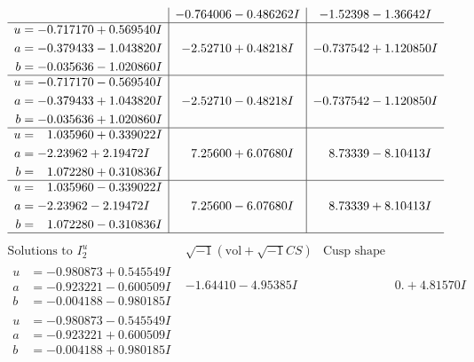 \documentclass[1p]{elsarticle_modified}
\theoremstyle{definition}
\newcommand{\I}{\sqrt{-1}}
\begin{document}
$$\begin{array}{c|c|c}
 & -0.764006 - 0.486262 I & -1.52398 - 1.36642 I \\ \hline\begin{aligned}
u &= -0.717170 + 0.569540 I \\
a &= -0.379433 - 1.043820 I \\
b &= -0.035636 - 1.020860 I\end{aligned}
 & -2.52710 + 0.48218 I & -0.737542 + 1.120850 I \\ \hline\begin{aligned}
u &= -0.717170 - 0.569540 I \\
a &= -0.379433 + 1.043820 I \\
b &= -0.035636 + 1.020860 I\end{aligned}
 & -2.52710 - 0.48218 I & -0.737542 - 1.120850 I \\ \hline\begin{aligned}
u &= \phantom{-}1.035960 + 0.339022 I \\
a &= -2.23962 + 2.19472 I \\
b &= \phantom{-}1.072280 + 0.310836 I\end{aligned}
 & \phantom{-}7.25600 + 6.07680 I & \phantom{-}8.73339 - 8.10413 I \\ \hline\begin{aligned}
u &= \phantom{-}1.035960 - 0.339022 I \\
a &= -2.23962 - 2.19472 I \\
b &= \phantom{-}1.072280 - 0.310836 I\end{aligned}
 & \phantom{-}7.25600 - 6.07680 I & \phantom{-}8.73339 + 8.10413 I\\
 \hline 
 \end{array}$$\newpage$$\begin{array}{c|c|c}  
\text{Solutions to }I^u_{2}& \I (\text{vol} + \sqrt{-1}CS) & \text{Cusp shape}\\
 \hline 
\begin{aligned}
u &= -0.980873 + 0.545549 I \\
a &= -0.923221 - 0.600509 I \\
b &= -0.004188 - 0.980185 I\end{aligned}
 & -1.64410 - 4.95385 I & \phantom{-0.000000 -}0. + 4.81570 I \\ \hline\begin{aligned}
u &= -0.980873 - 0.545549 I \\
a &= -0.923221 + 0.600509 I \\
b &= -0.004188 + 0.980185 I\end{aligned}

\end{array}$$
\end{document}
